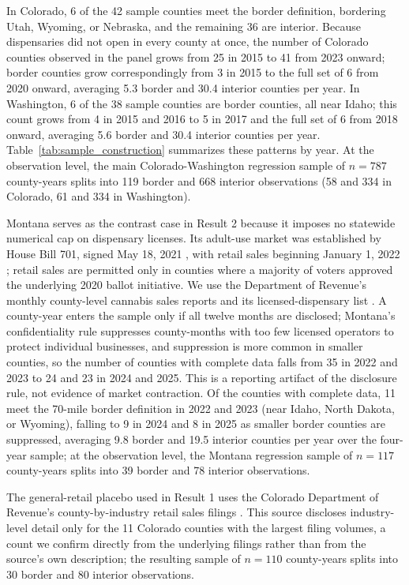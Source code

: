 \documentclass[12pt]{article}
\begin{document}
In Colorado, 6 of the 42 sample counties meet the border definition, bordering Utah, Wyoming, or Nebraska,
and the remaining 36 are interior. Because dispensaries did not open in every county at once, the number of
Colorado counties observed in the panel grows from 25 in 2015 to 41 from 2023 onward; border counties grow
correspondingly from 3 in 2015 to the full set of 6 from 2020 onward, averaging 5.3 border and 30.4 interior
counties per year. In Washington, 6 of the 38 sample counties are border counties, all near Idaho; this count
grows from 4 in 2015 and 2016 to 5 in 2017 and the full set of 6 from 2018 onward, averaging 5.6 border and
30.4 interior counties per year. Table~\ref{tab:sample_construction} summarizes these patterns by year. At
the observation level, the main Colorado-Washington regression sample of $n=787$ county-years splits into
119 border and 668 interior observations (58 and 334 in Colorado, 61 and 334 in Washington).

Montana serves as the contrast case in Result 2 because it imposes no statewide numerical cap on dispensary
licenses. Its adult-use market was established by House Bill 701, signed May 18, 2021 \citep{MTHB701}, with
retail sales beginning January 1, 2022 \citep{MTRevenueCannabis}; retail sales are permitted only in counties
where a majority of voters approved the underlying 2020 ballot initiative. We use the Department of Revenue's
monthly county-level cannabis sales reports \citep{MTRevenueCountySales} and its licensed-dispensary list
\citep{MTDispensaryLocations}. A county-year enters the sample only if all twelve months are disclosed;
Montana's confidentiality rule suppresses county-months with too few licensed operators to protect individual
businesses, and suppression is more common in smaller counties, so the number of counties with complete data
falls from 35 in 2022 and 2023 to 24 and 23 in 2024 and 2025. This is a reporting artifact of the disclosure
rule, not evidence of market contraction. Of the counties with complete data, 11 meet the 70-mile border
definition in 2022 and 2023 (near Idaho, North Dakota, or Wyoming), falling to 9 in 2024 and 8 in 2025 as
smaller border counties are suppressed, averaging 9.8 border and 19.5 interior counties per year over the
four-year sample; at the observation level, the Montana regression sample of $n=117$ county-years splits into
39 border and 78 interior observations.

The general-retail placebo used in Result 1 uses the Colorado Department of Revenue's county-by-industry
retail sales filings \citep{CDORRetailByCounty}. This source discloses industry-level detail only for the 11
Colorado counties with the largest filing volumes, a count we confirm directly from the underlying filings
rather than from the source's own description; the resulting sample of $n=110$ county-years splits into 30
border and 80 interior observations.
\end{document}
